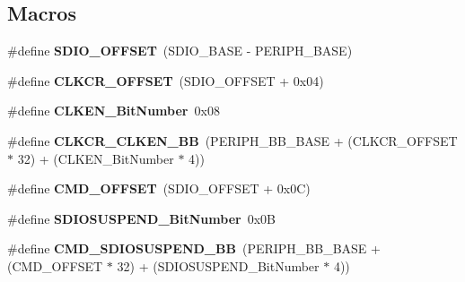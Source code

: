 \subsection*{Macros}
\begin{DoxyCompactItemize}
\item 
\hypertarget{group___s_d_i_o_gabf07aced03df5f46d57cea1d4f56d1e3}{\#define {\bfseries S\-D\-I\-O\-\_\-\-O\-F\-F\-S\-E\-T}~(S\-D\-I\-O\-\_\-\-B\-A\-S\-E -\/ P\-E\-R\-I\-P\-H\-\_\-\-B\-A\-S\-E)}\label{group___s_d_i_o_gabf07aced03df5f46d57cea1d4f56d1e3}

\item 
\hypertarget{group___s_d_i_o_gac5d642be874338519fdec175204ca8ed}{\#define {\bfseries C\-L\-K\-C\-R\-\_\-\-O\-F\-F\-S\-E\-T}~(S\-D\-I\-O\-\_\-\-O\-F\-F\-S\-E\-T + 0x04)}\label{group___s_d_i_o_gac5d642be874338519fdec175204ca8ed}

\item 
\hypertarget{group___s_d_i_o_ga6ad1da47f9d84c54eb620b9231ebec86}{\#define {\bfseries C\-L\-K\-E\-N\-\_\-\-Bit\-Number}~0x08}\label{group___s_d_i_o_ga6ad1da47f9d84c54eb620b9231ebec86}

\item 
\hypertarget{group___s_d_i_o_gabfb5772b9b734972b576309f7ca8bf92}{\#define {\bfseries C\-L\-K\-C\-R\-\_\-\-C\-L\-K\-E\-N\-\_\-\-B\-B}~(P\-E\-R\-I\-P\-H\-\_\-\-B\-B\-\_\-\-B\-A\-S\-E + (C\-L\-K\-C\-R\-\_\-\-O\-F\-F\-S\-E\-T $\ast$ 32) + (C\-L\-K\-E\-N\-\_\-\-Bit\-Number $\ast$ 4))}\label{group___s_d_i_o_gabfb5772b9b734972b576309f7ca8bf92}

\item 
\hypertarget{group___s_d_i_o_gaf12d26702ce7a88d2a3dae87f000b75e}{\#define {\bfseries C\-M\-D\-\_\-\-O\-F\-F\-S\-E\-T}~(S\-D\-I\-O\-\_\-\-O\-F\-F\-S\-E\-T + 0x0\-C)}\label{group___s_d_i_o_gaf12d26702ce7a88d2a3dae87f000b75e}

\item 
\hypertarget{group___s_d_i_o_gaf88f03a42d76974b55dfb8bda65ade97}{\#define {\bfseries S\-D\-I\-O\-S\-U\-S\-P\-E\-N\-D\-\_\-\-Bit\-Number}~0x0\-B}\label{group___s_d_i_o_gaf88f03a42d76974b55dfb8bda65ade97}

\item 
\hypertarget{group___s_d_i_o_ga931e48aa282e2a937308f57f807e0781}{\#define {\bfseries C\-M\-D\-\_\-\-S\-D\-I\-O\-S\-U\-S\-P\-E\-N\-D\-\_\-\-B\-B}~(P\-E\-R\-I\-P\-H\-\_\-\-B\-B\-\_\-\-B\-A\-S\-E + (C\-M\-D\-\_\-\-O\-F\-F\-S\-E\-T $\ast$ 32) + (S\-D\-I\-O\-S\-U\-S\-P\-E\-N\-D\-\_\-\-Bit\-Number $\ast$ 4))}\label{group___s_d_i_o_ga931e48aa282e2a937308f57f807e0781}


\end{DoxyCompactItemize}
